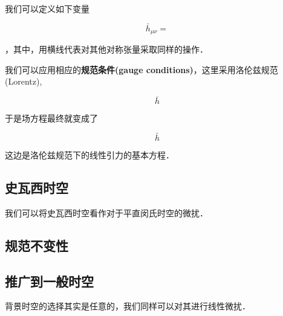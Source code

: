 我们可以定义如下变量

\begin{equation}
\bar{h}_{\mu\nu} = 
\end{equation}

，其中，用横线代表对其他对称张量采取同样的操作．

我们可以应用相应的\textbf{规范条件(gauge conditions)}，这里采用洛伦兹规范(Lorentz),

\begin{equation}
\bar{h}
\end{equation}

于是场方程最终就变成了

\begin{equation}
\bar{h}
\end{equation}

这边是洛伦兹规范下的线性引力的基本方程．


\subsection{史瓦西时空}

我们可以将史瓦西时空看作对于平直闵氏时空的微扰．


\subsection{规范不变性}


\subsection{推广到一般时空}

背景时空的选择其实是任意的，我们同样可以对其进行线性微扰．

